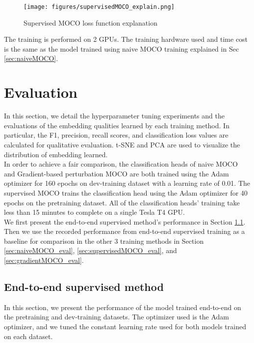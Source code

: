 \documentclass[12pt,twoside]{report}
\begin{document}
\begin{figure}
    \centering
    \texttt{[image: figures/supervisedMOCO\_explain.png]}
    \caption{Supervised MOCO loss function explanation}
    \label{fig:supervisedMOCO_loss_explain}
\end{figure}

The training is performed on 2 GPUs. The training hardware used and time cost is the same as the model trained using naive MOCO training explained in Sec \ref{sec:naiveMOCO}. 

\chapter{Evaluation}
In this section, we detail the hyperparameter tuning experiments and the evaluations of the embedding qualities learned by each training method. In particular, the F1, precision, recall scores, and classification loss values are calculated for qualitative evaluation. t-SNE and PCA are used to visualize the distribution of embedding learned. \\

In order to achieve a fair comparison, the classification heads of naive MOCO and Gradient-based perturbation MOCO are both trained using the Adam optimizer for 160 epochs on dev-training dataset with a learning rate of 0.01. The supervised MOCO trains the classification head using the Adam optimizer for 40 epochs on the pretraining dataset. All of the classification heads' training take less than 15 minutes to complete on a single Tesla T4 GPU. \\

We first present the end-to-end supervised method's performance in Section \ref{sec:end2end}. Then we use the recorded performance from end-to-end supervised training as a baseline for comparison in the other 3 training methods in Section \ref{sec:naiveMOCO_eval}, \ref{sec:supervisedMOCO_eval}, and \ref{sec:gradientMOCO_eval}. 

\section{End-to-end supervised method} \label{sec:end2end}
In this section, we present the performance of the model trained end-to-end on the pretraining and dev-training datasets. The optimizer used is the Adam optimizer, and we tuned the constant learning rate used for both models trained on each dataset. \\
\end{document}
